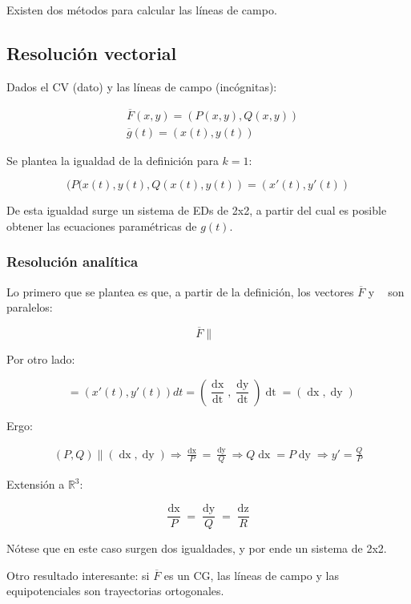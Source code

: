 \documentclass{article}
\renewcommand{\Bbb}{\mathbb}
\begin{document}
Existen dos métodos para calcular las líneas de campo.

\subsection{Resolución vectorial}

Dados el CV (dato) y las líneas de campo (incógnitas):

\begin{align}
& \overline{F}(x,y) = (P(x,y), Q(x,y)) \\
& \overline{g}(t) = (x(t), y(t))
\end{align}

Se plantea la igualdad de la definición para $k = 1$:

\begin{equation}
(P(x(t), y(t), Q(x(t), y(t)) = (x'(t), y'(t))
\end{equation}

De esta igualdad surge un sistema de EDs de 2x2, a partir del cual es posible obtener las ecuaciones paramétricas de $g(t)$.

\subsubsection{Resolución analítica}

Lo primero que se plantea es que, a partir de la definición, los vectores $\overline{F}$ y $\mathop{\overline{dg}}$ son paralelos:

\begin{equation}
\overline{F} \parallel \mathop{\overline{dg}}
\end{equation}

Por otro lado:

\begin{equation}
\mathop{\overline{dg}} = (x'(t), y'(t)) dt = \left( \frac{\mathop{dx}}{\mathop{dt}}, \frac{\mathop{dy}}{\mathop{dt}} \right) \mathop{dt} = (\mathop{dx}, \mathop{dy})
\end{equation}

Ergo:

\begin{align}
(P, Q) \parallel (\mathop{dx}, \mathop{dy}) \Rightarrow \frac{\mathop{dx}}{P} = \frac{\mathop{dy}}{Q} \Rightarrow Q \mathop{dx} = P \mathop{dy} \Rightarrow y' = \frac{Q}{P}
\end{align}

Extensión a $\Bbb R^3$:

\begin{equation}
\frac{\mathop{dx}}{P} = \frac{\mathop{dy}}{Q} = \frac{\mathop{dz}}{R}
\end{equation}

Nótese que en este caso surgen dos igualdades, y por ende un sistema de 2x2.

Otro resultado interesante: si $\overline{F}$ es un CG, las líneas de campo y las equipotenciales son trayectorias ortogonales.
\end{document}
